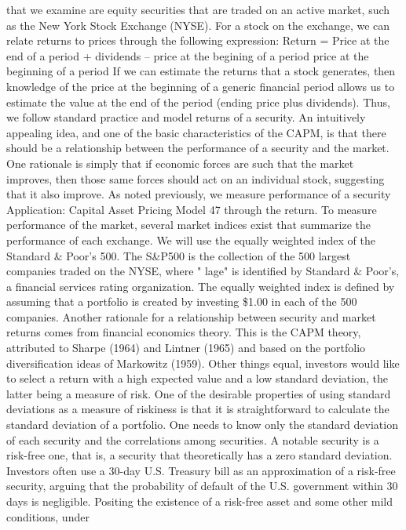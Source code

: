 \documentclass[11pt]{article}
\begin{document}
that we examine are equity securities that are traded on an active market, such
as the New York Stock Exchange (NYSE). For a stock on the exchange, we can
relate returns to prices through the following expression:
Return = Price at the end of a period + dividends -- price at the begining of a period
 price at the beginning of a period
If we can estimate the returns that a stock generates, then knowledge of the
 price at the beginning of a generic financial period allows us to estimate the value
at the end of the period (ending price plus dividends). Thus, we follow standard
practice and model returns of a security.
 An intuitively appealing idea, and one of the basic characteristics of the CAPM,
 is that there should be a relationship between the performance of a security and the
market. One rationale is simply that if economic forces are such that the market
improves, then those same forces should act on an individual stock, suggesting
 that it also improve. As noted previously, we measure performance of a security
 Application: Capital Asset Pricing Model 47
 through the return. To measure performance of the market, several market indices
exist that summarize the performance of each exchange. We will use the equally
weighted index of the Standard \(\&\) Poor's 500. The S\&P500 is the collection of
the 500 largest companies traded on the NYSE, where " lage" is identified by
Standard \(\&\) Poor's, a financial services rating organization. The equally weighted
 index is defined by assuming that a portfolio is created by investing \$1.00 in each
 of the 500 companies.
 Another rationale for a relationship between security and market returns comes
from financial economics theory. This is the CAPM theory, attributed to Sharpe
(1964) and Lintner (1965) and based on the portfolio diversification ideas of
 Markowitz (1959). Other things equal, investors would like to select a return with
 a high expected value and a low standard deviation, the latter being a measure of
risk. One of the desirable properties of using standard deviations as a measure
of riskiness is that it is straightforward to calculate the standard deviation of a
portfolio. One needs to know only the standard deviation of each security and
the correlations among securities. A notable security is a risk-free one, that is,
a security that theoretically has a zero standard deviation. Investors often use a
 30-day U.S. Treasury bill as an approximation of a risk-free security, arguing that
 the probability of default of the U.S. government within 30 days is negligible.
Positing the existence of a risk-free asset and some other mild conditions, under
\end{document}
